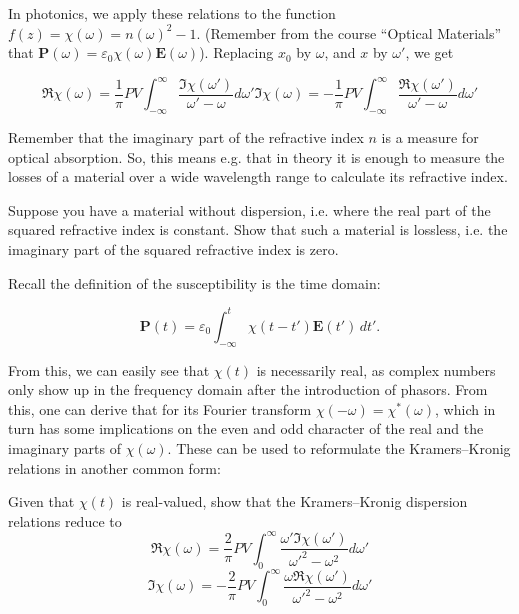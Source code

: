 In photonics, we apply these relations to the function $f(z) = \chi(\omega) =
n(\omega)^2 -1$. (Remember from the course ``Optical Materials'' that
$\mathbf{P}(\omega)=\varepsilon_0 \chi(\omega) \mathbf{E}(\omega)$). Replacing
$x_0$ by $\omega$, and $x$ by $\omega'$, we get

\begin{subequations} 
\begin{equation}
\Re \chi(\omega) = \frac{1}{\pi} PV \int_{- \infty}^{\infty} \frac{\Im
\chi(\omega')}{\omega'-\omega}d\omega'
\end{equation} 
\begin{equation}
\Im \chi(\omega) = -\frac{1}{\pi} PV \int_{- \infty}^{\infty} \frac{\Re
\chi(\omega')}{\omega'-\omega}d\omega'
\end{equation}
\label{eq-KK-2}
\end{subequations}

Remember that the imaginary part of the refractive index $n$ is a measure for
optical absorption. So, this means e.g. that in theory it is enough to measure
the losses of a material over a wide wavelength range to calculate its
refractive index.

\begin{exer}
Suppose you have a material without dispersion, i.e. where the real part of the squared refractive index is constant. Show that such a material is lossless, i.e. the imaginary part of the squared refractive index is zero.
\end{exer}

Recall the definition of the susceptibility is the time domain:

\begin{equation}
\mathbf{P}(t)=\varepsilon_0 \int_{-\infty}^t \chi(t-t') \mathbf{E}(t')\, dt'.
\end{equation}

From this, we can easily see that $\chi(t)$ is necessarily real, as complex
numbers only show up in the frequency domain after the introduction of phasors.
From this, one can derive that for its Fourier transform $\chi(-\omega) =
\chi^*(\omega)$, which in turn has some implications on the even and odd
character of the real and the imaginary parts of $\chi(\omega)$. These can be
used to reformulate the Kramers--Kronig relations in another common form:

\begin{exer}
Given that $\chi(t)$ is real-valued, show that the Kramers--Kronig dispersion relations reduce to
$$\Re \chi(\omega) =  \frac{2}{\pi} PV \int_{0}^{\infty}{ \frac{\omega'\Im \chi(\omega')}{\omega'^2-\omega^2}d\omega'}$$
$$\Im \chi(\omega) = -\frac{2}{\pi} PV \int_{0}^{\infty}{ \frac{\omega \Re \chi(\omega')}{\omega'^2-\omega^2}d\omega'}$$
\end{exer}

